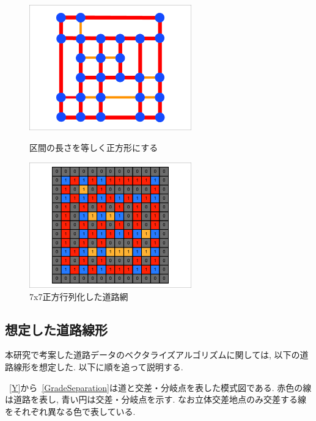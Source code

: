 \begin{figure}[htbp]
    \begin{minipage}{0.5\hsize}
        \begin{center}
            \includegraphics[width=70mm]{assets/MAP_5.eps}
        \end{center}
        \caption{区間の長さを等しく正方形にする}
        \label{rs:5}
    \end{minipage}
    \begin{minipage}{0.5\hsize}
        \begin{center}
            \includegraphics[width=70mm]{assets/MAP_6.eps}
        \end{center}
        \caption{7x7正方行列化した道路網}
        \label{rs:6}
    \end{minipage}
\end{figure}




\subsection{想定した道路線形}

本研究で考案した道路データのベクタライズアルゴリズムに関しては, 以下の道路線形を想定した.
以下に順を追って説明する.

~\ref{Y}から~\ref{GradeSeparation}は道と交差・分岐点を表した模式図である. 赤色の線は道路を表し, 青い円は交差・分岐点を示す. なお立体交差地点のみ交差する線をそれぞれ異なる色で表している.

